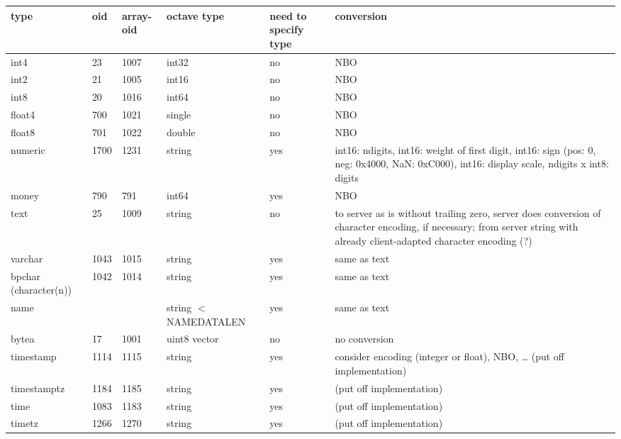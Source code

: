 \documentclass[a4paper,landscape]{article}
\begin{document}
\begin{longtable}{lp{40mm}p{40mm}p{50mm}p{40mm}p{50mm}}
type &
oid &
array-oid &
octave type &
need to specify type &
conversion \\\hline

int4 &
23 &
1007 &
int32 &
no &
NBO \\

int2 &
21 &
1005 &
int16 &
no &
NBO \\

int8 &
20 &
1016 &
int64 &
no &
NBO \\

float4 &
700 &
1021 &
single &
no &
NBO \\

float8 &
701 &
1022 &
double &
no &
NBO \\

numeric &
1700 &
1231 &
string &
yes &
int16: ndigits, int16: weight of first digit, int16: sign (pos: 0,
neg: 0x4000, NaN: 0xC000), int16: display scale, ndigits x int8:
digits \\

money &
790 &
791 &
int64 &
yes &
NBO \\

text &
25 &
1009 &
string &
no &
to server as is without trailing zero, server does conversion of
character encoding, if necessary; from server string with already
client-adapted character encoding (?) \\

varchar &
1043 &
1015 &
string &
yes &
same as text \\

bpchar (character(n)) &
1042 &
1014 &
string &
yes &
same as text \\

name &
&
&
string $<$ NAMEDATALEN &
yes &
same as text \\

bytea &
17 &
1001 &
uint8 vector &
no &
no conversion \\

timestamp &
1114 &
1115 &
string &
yes &
consider encoding (integer or float), NBO, \ldots{} (put off
implementation) \\

timestamptz &
1184 &
1185 &
string &
yes &
(put off implementation) \\

time &
1083 &
1183 &
string &
yes &
(put off implementation) \\

timetz &
1266 &
1270 &
string &
yes &
(put off implementation) \\


\end{longtable}
\end{document}
